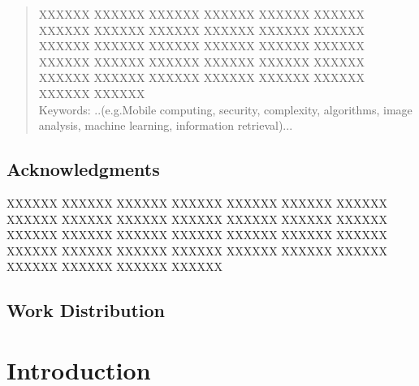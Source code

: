 \documentclass[letterpaper,11pt]{report}
\begin{document}
\begin{abstract}

  XXXXXX XXXXXX XXXXXX XXXXXX XXXXXX XXXXXX XXXXXX XXXXXX XXXXXX XXXXXX XXXXXX XXXXXX XXXXXX XXXXXX XXXXXX XXXXXX XXXXXX XXXXXX XXXXXX XXXXXX XXXXXX XXXXXX XXXXXX XXXXXX XXXXXX XXXXXX XXXXXX XXXXXX XXXXXX XXXXXX XXXXXX XXXXXX  \\

  \vspace{2in}
  Keywords: ..(e.g.Mobile computing, security, complexity, algorithms, image analysis, machine learning, information retrieval)...
\end{abstract}

\newpage



\section*{Acknowledgments}\label{section:acknowledgments}
\pagestyle{plain}

XXXXXX XXXXXX XXXXXX XXXXXX XXXXXX XXXXXX XXXXXX XXXXXX XXXXXX XXXXXX XXXXXX XXXXXX XXXXXX XXXXXX XXXXXX XXXXXX XXXXXX XXXXXX XXXXXX XXXXXX XXXXXX XXXXXX XXXXXX XXXXXX XXXXXX XXXXXX XXXXXX XXXXXX XXXXXX XXXXXX XXXXXX XXXXXX

\vspace{2in}
\section*{Work Distribution}

\newpage

\tableofcontents



\newpage
\mbox{}



\chapter{Introduction}\label{chapter:introduction}
\setcounter{page}{1}
\onehalfspacing


%

%
%


\end{document}
